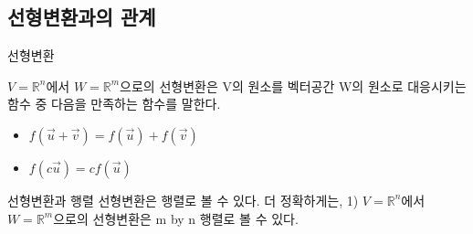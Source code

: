 \documentclass{beamer}
\begin{document}












\subsection{선형변환과의 관계} 

\begin{frame}{선형변환} 

$V=\mathds{R}^n$에서 $W=\mathds{R}^m$으로의 선형변환은 V의 원소를 벡터공간 W의 원소로 대응시키는 함수 중 다음을 만족하는 함수를 말한다. 
\begin{itemize} 
\item $f(\vec{u} + \vec{v}) = f(\vec{u}) + f(\vec{v})$
\item $f(c\vec{u}) = c f(\vec{u}) $
\end{itemize}
\end{frame}

\begin{frame}{선형변환과 행렬} 
선형변환은 행렬로 볼 수 있다. 더 정확하게는, 1) $V=\mathds{R}^n$에서 $W=\mathds{R}^m$으로의 선형변환은 m by n 행렬로 볼 수 있다. 
\end{frame}
\end{document}
